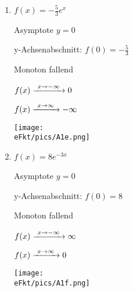 \begin{Answer}[ref=eFktA1]
\begin{minipage}{\textwidth}
{\begin{minipage}{0.5\textwidth}
\begin{enumerate}[label=\alph*)]
				Asymptote \(y=0\)

				y-Achsenabschnitt: \(f(0)=2\)

				Monoton fallend

				\(f(x)\xrightarrow{\hphantom{\ }x\to-\infty\hphantom{\ }}\infty\)

				\(f(x)\xrightarrow{\hphantom{\ }x\to\infty\hphantom{\ }}0\)

				\texttt{[image: \\eFkt/pics/A1d.png]}
				\item \(f(x)=-\frac{5}{3}e^{x}\)

				Asymptote \(y=0\)

				y-Achsenabschnitt: \(f(0)=-\frac{5}{3}\)

				Monoton fallend

				\(f(x)\xrightarrow{\hphantom{\ }x\to-\infty\hphantom{\ }}0\)

				\(f(x)\xrightarrow{\hphantom{\ }x\to\infty\hphantom{\ }}-\infty\)

				\texttt{[image: \\eFkt/pics/A1e.png]}
				\item \(f(x)=8e^{-3x}\)

				Asymptote \(y=0\)

				y-Achsenabschnitt: \(f(0)=8\)

				Monoton fallend

				\(f(x)\xrightarrow{\hphantom{\ }x\to-\infty\hphantom{\ }}\infty\)

				\(f(x)\xrightarrow{\hphantom{\ }x\to\infty\hphantom{\ }}0\)

				\texttt{[image: \\eFkt/pics/A1f.png]}
			\end{enumerate}
		\end{minipage}}%
	\end{minipage}%

	\begin{minipage}{\textwidth}
\end{minipage}
\end{Answer}

